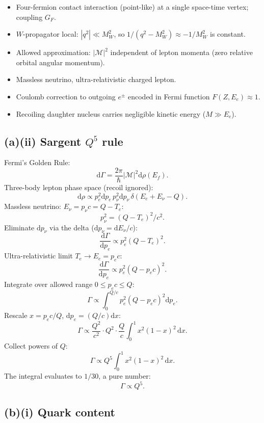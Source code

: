 \documentclass[11pt]{article}
\newcommand{\de}{\mathrm{d}}
\begin{document}
\begin{itemize}
\item Four-fermion contact interaction (point-like) at a single space-time vertex; coupling $G_{F}$.
\item $W$-propagator local: $|q^{2}|\ll M_{W}^{2}$, so $1/(q^{2}-M_{W}^{2})\approx -1/M_{W}^{2}$ is constant.
\item Allowed approximation: $|\mathcal M|^{2}$ independent of lepton momenta (zero relative orbital angular momentum).
\item Massless neutrino, ultra-relativistic charged lepton.
\item Coulomb correction to outgoing $e^{\pm}$ encoded in Fermi function $F(Z,E_{e})\approx 1$.
\item Recoiling daughter nucleus carries negligible kinetic energy ($M\gg E_e$).
\end{itemize}

\subsection*{(a)(ii) Sargent $Q^{5}$ rule}

Fermi's Golden Rule:
\[
\de\Gamma=\frac{2\pi}{\hbar}|\mathcal M|^{2}\de\rho(E_f).
\]
Three-body lepton phase space (recoil ignored):
\[
\de\rho\propto p_{e}^{2}\de p_{e}\,p_{\nu}^{2}\de p_{\nu}\,\delta(E_{e}+E_{\nu}-Q).
\]
Massless neutrino: $E_\nu=p_\nu c=Q-T_e$:
\[
p_\nu^{2}=(Q-T_e)^{2}/c^{2}.
\]
Eliminate $\de p_\nu$ via the delta ($\de p_\nu=\de E_\nu/c$):
\[
\frac{\de\Gamma}{\de p_e}\propto p_{e}^{2}(Q-T_{e})^{2}.
\]
Ultra-relativistic limit $T_e\to E_e=p_e c$:
\[
\frac{\de\Gamma}{\de p_e}\propto p_{e}^{2}(Q-p_{e}c)^{2}.
\]
Integrate over allowed range $0\le p_e c\le Q$:
\[
\Gamma\propto \int_{0}^{Q/c}p_{e}^{2}(Q-p_{e}c)^{2}\de p_{e}.
\]
Rescale $x=p_e c/Q$, $\de p_e=(Q/c)\de x$:
\[
\Gamma\propto \frac{Q^{2}}{c^{2}}\cdot Q^{2}\cdot \frac{Q}{c}\int_{0}^{1}x^{2}(1-x)^{2}\,\de x.
\]
Collect powers of $Q$:
\[
\Gamma\propto Q^{5}\int_{0}^{1}x^{2}(1-x)^{2}\,\de x.
\]
The integral evaluates to $1/30$, a pure number:
\begin{equation}
\boxed{\;\Gamma\propto Q^{5}.\;}
\label{eq:Sargent}
\end{equation}

\subsection*{(b)(i) Quark content}
\end{document}
